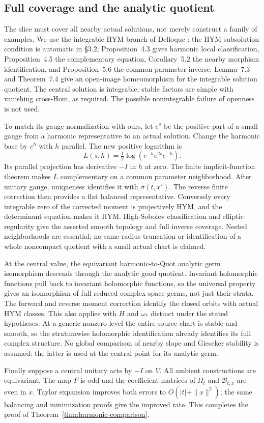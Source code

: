 \subsection{Full coverage and the analytic quotient}
The slice must cover all nearby actual solutions, not merely
construct a family of examples. We use the integrable HYM branch
of Delloque \cite{Del25}: the HYM subsolution condition is automatic
in \S3.2; Proposition~4.3 gives harmonic local classification,
Proposition~4.5 the complementary equation, Corollary~5.2 the
nearby morphism identification, and Proposition~5.6 the
common-parameter inverse. Lemma~7.3 and Theorem~7.4 give an
open-image homeomorphism for the integrable solution quotient.
The central solution is integrable; stable factors are simple
with vanishing cross-Hom, as required.
The possible nonintegrable failure of openness is not used.

To match its gauge normalization with ours, let $e^s$ be the
positive part of a small gauge from a harmonic representative
to an actual solution. Change the harmonic base by $e^h$ with
$h$ parallel. The new positive logarithm is
\[
 L(s,h)=\tfrac12\log(e^{-h}e^{2s}e^{-h}).
\]
Its parallel projection has derivative $-I$ in $h$ at zero.
The finite implicit-function theorem makes $L$ complementary
on a common parameter neighborhood. After unitary gauge,
uniqueness identifies it with $\sigma(t,x')$.
The reverse finite correction then provides a flat balanced
representative. Conversely every integrable zero of the corrected
moment is projectively HYM, and the determinant equation makes
it HYM. High-Sobolev classification and elliptic regularity give
the asserted smooth topology and full inverse coverage.
Nested neighborhoods are essential; no same-radius truncation
or identification of a whole noncompact quotient with a small
actual chart is claimed.

At the central value, the equivariant harmonic-to-Quot analytic
germ isomorphism descends through the analytic good quotient.
Invariant holomorphic functions pull back to invariant holomorphic
functions, so the universal property gives an isomorphism of
full reduced complex-space germs, not just their strata.
The forward and reverse moment correction identify the closed
orbits with actual HYM classes. This also applies with $H$ and
$\omega_*$ distinct under the stated hypotheses.
At a generic nonzero level the entire source chart is stable
and smooth, so the stratumwise holomorphic identification already
identifies its full complex structure.
No global comparison of nearby slope and Gieseker stability
is assumed: the latter is used at the central point for its
analytic germ.

Finally suppose a central unitary acts by $-I$ on $V$.
All ambient constructions are equivariant. The map $F$ is odd
and the coefficient matrices of $\Omega_t$ and $\mathcal B_{t,x}$
are even in $x$. Taylor expansion improves both errors to
$O(|t|+\|x\|^2)$; the same balancing and minimization proofs give
the improved rate. This completes the proof of
Theorem~\ref{thm:harmonic-comparison}.

